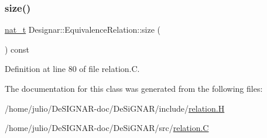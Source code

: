 \subsubsection{\texorpdfstring{size()}{size()}}
{\footnotesize\ttfamily \hyperlink{namespace_designar_aa72662848b9f4815e7bf31a7cf3e33d1}{nat\+\_\+t} Designar\+::\+Equivalence\+Relation\+::size (\begin{DoxyParamCaption}{ }\end{DoxyParamCaption}) const}



Definition at line 80 of file relation.\+C.



The documentation for this class was generated from the following files\+:\begin{DoxyCompactItemize}
\item 
/home/julio/\+De\+S\+I\+G\+N\+A\+R-\/doc/\+De\+Si\+G\+N\+A\+R/include/\hyperlink{relation_8_h}{relation.\+H}\item 
/home/julio/\+De\+S\+I\+G\+N\+A\+R-\/doc/\+De\+Si\+G\+N\+A\+R/src/\hyperlink{relation_8_c}{relation.\+C}\end{DoxyCompactItemize}

